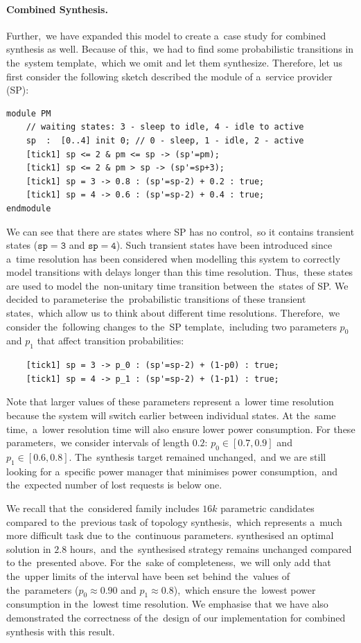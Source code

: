 \paragraph{Combined Synthesis.}
Further,~we have expanded this model to create a~case study for combined synthesis as well.
Because of this,~we had to find some probabilistic transitions in the~system template,~which we omit and let them synthesize.
Therefore, let us first consider the following sketch described the module of a~service provider (SP):
\begin{verbatim}
module PM
    // waiting states: 3 - sleep to idle, 4 - idle to active
    sp  :  [0..4] init 0; // 0 - sleep, 1 - idle, 2 - active
    [tick1] sp <= 2 & pm <= sp -> (sp'=pm);
    [tick1] sp <= 2 & pm > sp -> (sp'=sp+3);
    [tick1] sp = 3 -> 0.8 : (sp'=sp-2) + 0.2 : true;
    [tick1] sp = 4 -> 0.6 : (sp'=sp-2) + 0.4 : true;
endmodule
\end{verbatim}
\noindent
We can see that there are states where SP has no control,~so it contains transient states ($\mathtt{sp = 3}$ and $\mathtt{sp = 4}$).
Such transient states have been introduced since a~time resolution has been considered when modelling this system to correctly model transitions with delays longer than this time resolution.
Thus,~these states are used to model the~non-unitary time transition between the~states of SP.
We decided to parameterise the~probabilistic transitions of these transient states,~which allow us to think about different time resolutions.
Therefore,~we consider the~following changes to the~SP template,~including two parameters $p_0$ and $p_1$ that affect transition probabilities:
\begin{verbatim}
    [tick1] sp = 3 -> p_0 : (sp'=sp-2) + (1-p0) : true;
    [tick1] sp = 4 -> p_1 : (sp'=sp-2) + (1-p1) : true;
\end{verbatim}
\noindent
Note that larger values of these parameters represent a~lower time resolution because the system will switch earlier between individual states.
At the~same time,~a~lower resolution time will also ensure lower power consumption.
For these parameters,~we consider intervals of length $0.2$: $p_0 \in [0.7, 0.9]$ and $p_1 \in [0.6, 0.8]$.
The~synthesis target remained unchanged,~and we are still looking for a~specific power manager that minimises power consumption,~and the~expected number of lost requests is below one.

We recall that the~considered family includes $16k$ parametric candidates compared to the~previous task of topology synthesis,~which represents a~much more difficult task due to the~continuous parameters.
\toolname{} synthesised an optimal solution in $2.8$ hours,~and the~synthesised strategy remains unchanged compared to the~presented above.
For the~sake of completeness,~we will only add that the~upper limits of the interval have been set behind the~values of the~parameters ($p_0 \approx 0.90$ and $p_1 \approx 0.8$),~which ensure the~lowest power consumption in the~lowest time resolution.
We emphasise that we have also demonstrated the correctness of the~design of our implementation for combined synthesis with this result.

